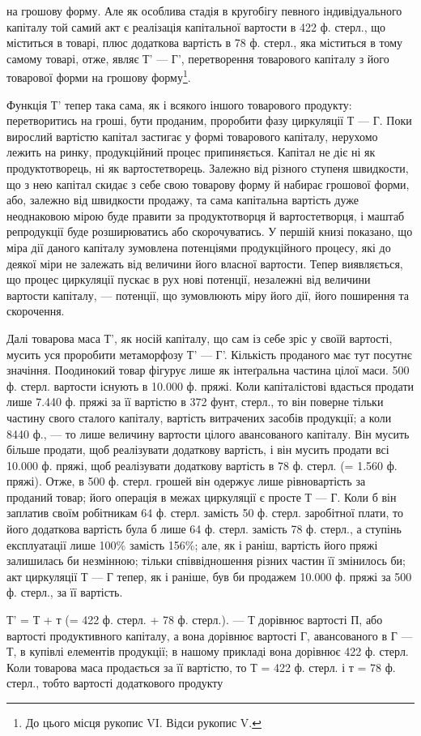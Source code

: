 на грошову форму. Але як особлива стадія в кругобігу певного індивідуального
капіталу той самий акт є реалізація капітальної вартости
в 422 ф. стерл., що міститься в товарі, плюс додаткова вартість в 78 ф.
стерл., яка міститься в тому самому товарі, отже, являє Т' — Г', перетворення
товарового капіталу з його товарової форми на грошову форму\footnote{
До цього місця рукопис VI. Відси рукопис V.
}.

Функція Т' тепер така сама, як і всякого іншого товарового продукту:
перетворитись на гроші, бути проданим, проробити фазу циркуляції
Т — Г. Поки вирослий вартістю капітал застигає у формі товарового
капіталу, нерухомо лежить на ринку, продукційний процес припиняється.
Капітал не діє ні як продуктотворець, ні як вартостетворець. Залежно від
різного ступеня швидкости, що з нею капітал скидає з себе свою товарову
форму й набирає грошової форми, або, залежно від швидкости продажу,
та сама капітальна вартість дуже неоднаковою мірою буде правити за
продуктотворця й вартостетворця, і маштаб репродукції буде розширюватись
або скорочуватись. У першій книзі показано, що міра дії даного
капіталу зумовлена потенціями продукційного процесу, які до деякої
міри не залежать від величини його власної вартости. Тепер виявляється,
що процес циркуляції пускає в рух нові потенції, незалежні від величини
вартости капіталу, — потенції, що зумовлюють міру його дії, його поширення
та скорочення.

Далі товарова маса Т', як носій капіталу, що сам із себе зріс у своїй
вартості, мусить уся проробити метаморфозу Т' — Г'. Кількість проданого
має тут посутнє значіння. Поодинокий товар фігурує лише як інтеґральна
частина цілої маси. 500 ф. стерл. вартости існують в 10.000 ф. пряжі.
Коли капіталістові вдасться продати лише 7.440 ф. пряжі за її вартістю
в 372 фунт, стерл., то він поверне тільки частину свого сталого капіталу,
вартість витрачених засобів продукції; а коли 8440 ф., — то лише величину
вартости цілого авансованого капіталу. Він мусить більше продати, щоб
реалізувати додаткову вартість, і він мусить продати всі 10.000 ф.
пряжі, щоб реалізувати додаткову вартість в 78 ф. стерл. (= 1.560 ф.
пряжі). Отже, в 500 ф. стерл. грошей він одержує лише рівновартість
за проданий товар; його операція в межах циркуляції є просте Т — Г.
Коли б він заплатив своїм робітникам 64 ф. стерл. замість 50 ф. стерл.
заробітної плати, то його додаткова вартість була б лише 64 ф. стерл.
замість 78 ф. стерл., а ступінь експлуатації лише 100\% замість
156\%; але, як і раніш, вартість його пряжі залишилась би незмінною;
тільки співвідношення різних частин її змінилось би; акт циркуляції Т — Г
тепер, як і раніше, був би продажем 10.000 ф. пряжі за 500 ф. стерл.,
за її вартість.

Т' = Т + т (= 422 ф. стерл. + 78 ф. стерл.). — Т дорівнює вартості П,
або вартості продуктивного капіталу, а вона дорівнює вартості Г, авансованого
в Г — Т, в купівлі елементів продукції; в нашому прикладі вона
дорівнює 422 ф. стерл. Коли товарова маса продається за її вартістю, то
Т = 422 ф. стерл. і т = 78 ф. стерл., тобто вартості додаткового продукту